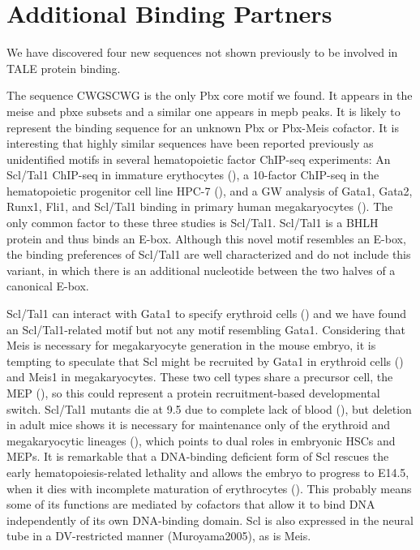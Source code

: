 \section{Additional Binding Partners}

We have discovered four new sequences not shown previously to be involved in \ac{TALE} protein binding. 

The sequence CWGSCWG is the only Pbx core motif we found. It appears in the \ac{meise} and \ac{pbxe} subsets and a similar one appears in \ac{mepb} peaks. It is likely to represent the binding sequence for an unknown Pbx or Pbx-Meis cofactor. It is interesting that highly similar sequences have been reported previously as unidentified motifs in several hematopoietic factor ChIP-seq experiments: An Scl/Tal1 ChIP-seq in immature erythocytes (\cite{Kassouf2010}), a 10-factor ChIP-seq in the hematopoietic progenitor cell line HPC-7 (\cite{Wilson2010}), and a \ac{GW} analysis of Gata1, Gata2, Runx1, Fli1, and Scl/Tal1 binding in primary human megakaryocytes (\cite{Tijssen2011}). The only common factor to these three studies is Scl/Tal1. Scl/Tal1 is a \ac{BHLH} protein and thus binds an E-box. Although this novel motif resembles an E-box, the binding preferences of Scl/Tal1 are well characterized and do not include this variant, in which there is an additional nucleotide between the two halves of a canonical E-box. %

Scl/Tal1 can interact with Gata1 to specify erythroid cells (\cite{ref}) and we have found an Scl/Tal1-related motif but not any motif resembling Gata1. Considering that Meis is necessary for megakaryocyte generation in the mouse embryo, it is tempting to speculate that Scl might be recruited by Gata1 in erythroid cells (\cite{Anguita2004}) and Meis1 in megakaryocytes. These two cell types share a precursor cell, the \ac{MEP} (\cite{ref}), so this could represent a protein recruitment-based developmental switch. Scl/Tal1 mutants die at 9.5 due to complete lack of blood (\cite{ref}), but deletion in adult mice shows it is necessary for maintenance only of the erythroid and megakaryocytic lineages (\cite{Mikkola2003}), which points to dual roles in embryonic \acp{HSC} and \acp{MEP}. It is remarkable that a DNA-binding deficient form of Scl rescues the early hematopoiesis-related lethality and allows the embryo to progress to E14.5, when it dies with incomplete maturation of erythrocytes (\cite{Porcher1999, Kassouf2008}). This probably means some of its functions are mediated by cofactors that allow it to bind DNA independently of its own DNA-binding domain. Scl is also expressed in the neural tube in a \ac{DV}-restricted manner (Muroyama2005), as is Meis.



